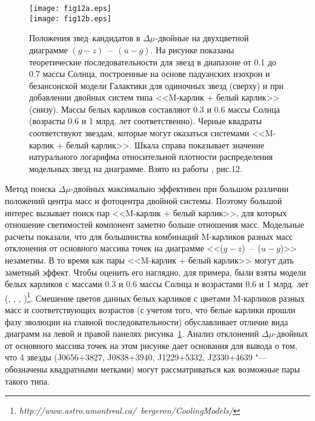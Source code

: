\begin{figure}[h]
\centering
\texttt{[image: fig12a.eps]}\\
\texttt{[image: fig12b.eps]}
\caption{Положения звед--кандидатов в $\Delta\mu$-двойные на двухцветной диаграмме $(g-z)$~--~$(u-g)$. На рисунке показаны теоретические последовательности для звезд в диапазоне от 0.1 до 0.7 массы Солнца, построенные на основе падуанских изохрон и безансонской модели Галактики для одиночных звезд (сверху) и при добавлении двойных систем типа  <<M-карлик + белый карлик>> (снизу). Массы белых карликов составляют 0.3 и 0.6 массы Солнца (возрасты 0.6 и 1 млрд. лет соответственно). Черные квадраты соответствуют звездам, которые могут оказаться системами  <<M-карлик + белый карлик>>. Шкала справа показывает значение натурального логарифма относительной плотности распределения модельных звезд на диаграмме. Взято из работы \cite{2015AstL...41..833K}, рис.12.}
\label{fig:15color}
\end{figure}

Метод поиска $\Delta\mu$-двойных максимально эффективен при большом различии положений центра масс и фотоцентра двойной системы. Поэтому большой интерес вызывает поиск пар <<M-карлик + белый карлик>>, для которых отношение светимостей компонент заметно больше отношения масс. Модельные расчеты показали, что для большинства комбинаций M-карликов разных масс отклонения от основного массива точек на диаграмме <<($g-z$)~--~($u-g$)>> незаметны. В то время как пары <<M-карлик + белый карлик>> могут дать заметный эффект. Чтобы оценить его наглядно, для примера, были взяты модели белых карликов  с массами 0.3 и 0.6 массы Солнца и возрастами 0.6 и 1 млрд. лет (\cite{2006AJ....132.1221H}, \cite{2011ApJ...737...28B}, \cite{2006ApJ...651L.137K}, \cite{2011ApJ...730..128T})\footnote{\textit{http://www.astro.umontreal.ca/~bergeron/CoolingModels/}}. Смешение цветов данных белых карликов с цветами M-карликов разных масс и соответствующих возрастов (с учетом того, что белые карлики прошли фазу эволюции на главной последовательности) обуславливает отличие вида диаграмм на левой и правой панелях рисунка~\ref{fig:15color}.  Анализ отклонений $\Delta\mu$-двойных от основного массива точек на этом рисунке дает основания для вывода о том, что 4 звезды (J0656+3827, J0838+3940, J1229+5332, J2330+4639 "--- обозначены квадратными метками) могут рассматриваться как возможные пары такого типа.

